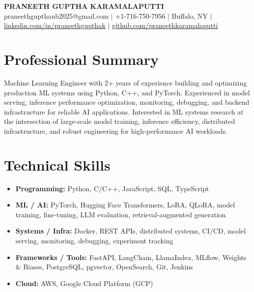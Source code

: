 \documentclass[letterpaper,10pt]{article}
\begin{document}
\begin{center}
    {\Large \textbf{PRANEETH GUPTHA KARAMALAPUTTI}} \\
    \vspace{3pt}
    \small
    praneethgupthaub2025@gmail.com $\vert$
    +1-716-750-7956 $\vert$
    Buffalo, NY $\vert$
    \href{https://linkedin.com/in/praneethgupthak}{linkedin.com/in/praneethgupthak} $\vert$
    \href{https://github.com/praneethkaramalaputti}{github.com/praneethkaramalaputti}
\end{center}

\section{Professional Summary}
Machine Learning Engineer with 2+ years of experience building and optimizing production ML systems using Python, C++, and PyTorch. Experienced in model serving, inference performance optimization, monitoring, debugging, and backend infrastructure for reliable AI applications. Interested in ML systems research at the intersection of large-scale model training, inference efficiency, distributed infrastructure, and robust engineering for high-performance AI workloads.

\section{Technical Skills}
\begin{itemize}[leftmargin=*]
    \item \textbf{Programming:} Python, C/C++, JavaScript, SQL, TypeScript
    \item \textbf{ML / AI:} PyTorch, Hugging Face Transformers, LoRA, QLoRA, model training, fine-tuning, LLM evaluation, retrieval-augmented generation
    \item \textbf{Systems / Infra:} Docker, REST APIs, distributed systems, CI/CD, model serving, monitoring, debugging, experiment tracking
    \item \textbf{Frameworks / Tools:} FastAPI, LangChain, LlamaIndex, MLflow, Weights \& Biases, PostgreSQL, pgvector, OpenSearch, Git, Jenkins
    \item \textbf{Cloud:} AWS, Google Cloud Platform (GCP)
\end{itemize}
\end{document}
